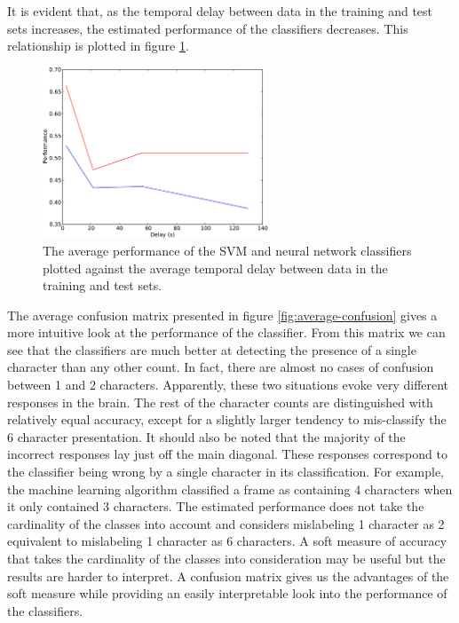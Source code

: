 \documentclass[authoryear]{elsarticle}
\begin{document}
It is evident that, as the temporal delay between data in the training and test sets increases, the estimated performance of the classifiers decreases.
This relationship is plotted in figure \ref{fig:performance-verse-temporal-distance}.

\begin{figure}
\centering
\includegraphics[width=0.6\textwidth]{figures/performance-verse-temporal-distance}
\caption{The average performance of the SVM and neural network classifiers plotted against the average temporal delay between data in the training and test sets.}
\label{fig:performance-verse-temporal-distance}
\end{figure}

The average confusion matrix presented in figure \ref{fig:average-confusion} gives a more intuitive look at the performance of the classifier.
From this matrix we can see that the classifiers are much better at detecting the presence of a single character than any other count.
In fact, there are almost no cases of confusion between 1 and 2 characters.
Apparently, these two situations evoke very different responses in the brain.
The rest of the character counts are distinguished with relatively equal accuracy,
except for a slightly larger tendency to mis-classify the 6 character presentation.
It should also be noted that the majority of the incorrect responses lay just off the main diagonal.
These responses correspond to the classifier being wrong by a single character in its classification.
For example, the machine learning algorithm classified a frame as containing 4 characters when it only contained 3 characters.
The estimated performance does not take the cardinality of the classes into account and considers mislabeling 1 character as 2 equivalent to mislabeling 1 character as 6 characters.
A soft measure of accuracy that takes the cardinality of the classes into consideration may be useful but the results are harder to interpret.
A confusion matrix gives us the advantages of the soft measure while providing an easily interpretable look into the performance of the classifiers.
\end{document}
